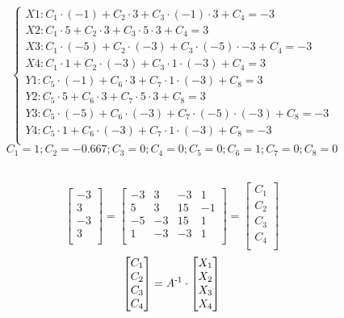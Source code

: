 \\
\noindent{}
\[
\begin{cases}
X1: C_1 \cdot (-1) + C_2 \cdot 3 + C_3 \cdot (-1) \cdot 3 + C_4 = -3 \\
X2: C_1 \cdot 5 + C_2 \cdot 3 + C_3 \cdot 5 \cdot 3 + C_4 = 3 \\
X3: C_1 \cdot (-5) + C_2 \cdot (-3) + C_3 \cdot (-5) \cdot -3 + C_4 = -3 \\
X4: C_1 \cdot 1 + C_2 \cdot (-3) + C_3 \cdot 1 \cdot (-3) + C_4 = 3 \\
Y1: C_5 \cdot (-1) + C_6 \cdot 3 + C_7 \cdot 1 \cdot (-3) + C_8 = 3 \\
Y2: C_5 \cdot 5 + C_6 \cdot 3 + C_7 \cdot 5 \cdot 3 + C_8 = 3 \\
Y3: C_5 \cdot (-5) + C_6 \cdot (-3) + C_7 \cdot (-5) \cdot (-3) + C_8 = -3 \\
Y4: C_5 \cdot 1 + C_6 \cdot (-3) + C_7 \cdot 1 \cdot (-3) + C_8 = -3 \\
\end{cases}
\]
\[
C_1 = 1; C_2 = -0.667;
C_3 = 0; C_4 = 0;
C_5 = 0; C_6 = 1;
C_7 = 0; C_8 = 0
\]

\\
\noindent{}
\[
\begin{bmatrix}
   -3\\
    3\\
   -3\\
    3\\
\end{bmatrix}=
\begin{bmatrix}
   -3 & 3 & -3 & 1\\
    5 & 3 & 15 & -1\\
   -5 & -3 & 15 & 1\\
    1 & -3 & -3 & 1\\
\end{bmatrix}=
\begin{bmatrix}
   C_1\\
   C_2\\
   C_3\\
   C_4\\
\end{bmatrix}
\]
\noindent{}
\[
\begin{bmatrix}
   C_1\\
   C_2\\
   C_3\\
   C_4\\
\end{bmatrix}=
A\textsuperscript{-1} \cdot 
\begin{bmatrix}
   X_1\\
   X_2\\
   X_3\\
   X_4\\
\end{bmatrix}
\]

